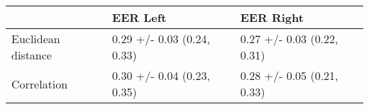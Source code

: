 \begin{tabular}{lll}
\toprule
{} &                    EER Left &                   EER Right \\
\midrule
Euclidean distance &  0.29 +/- 0.03 (0.24, 0.33) &  0.27 +/- 0.03 (0.22, 0.31) \\
Correlation        &  0.30 +/- 0.04 (0.23, 0.35) &  0.28 +/- 0.05 (0.21, 0.33) \\
\bottomrule
\end{tabular}
